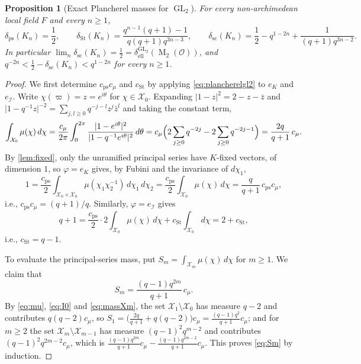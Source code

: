 \documentclass[11pt,reqno]{amsart}
\numberwithin{equation}{section}
\theoremstyle{plain}
\newtheorem{proposition}[theorem]{Proposition}
\theoremstyle{definition}
\theoremstyle{remark}
\theoremstyle{plain}
\newcommand{\OO}{\mathcal{O}}    %
\newcommand{\scd}[1]{\delta_{\mathrm{sc}}(#1)}
\newcommand{\elld}[2][]{\delta_{\mathrm{ell}}^{#1}(#2)}  %
\newcommand{\Pps}{\delta_{\mathrm{ps}}(K_n)}       %
\newcommand{\Pst}{\delta_{\mathrm{St}}(K_n)}
\newcommand{\Cps}{c_{\mathrm{ps}}}
\newcommand{\Cst}{c_{\mathrm{St}}}
\newcommand{\Cmu}{c_\mu}
\newcommand{\Iw}{\mathcal{I}}                   %
\newcommand{\Xc}{\mathcal{X}}                   %
\newcommand{\abs}[1]{\lvert#1\rvert}
\DeclareMathOperator{\GL}{GL}
\DeclareMathOperator{\Mat}{M}
\begin{document}
\begin{proposition}[Exact Plancherel masses for $\GL_2$]\label{prop:gl2exact}
For every non-archimedean local field $F$ and every $n\ge1$,
\[
\Pps=\frac12,\qquad
\Pst=\frac{q^{n-1}(q+1)-1}{q(q+1)q^{3n-3}},\qquad
\scd{K_n}=\frac12-q^{1-2n}+\frac1{(q+1)q^{3n-2}}.
\]
In particular $\lim_n\scd{K_n}=\frac12=\elld[\GL_2]{\Mat_2(\OO)}$, and
$q^{-2n}<\frac12-\scd{K_n}<q^{1-2n}$ for every $n\ge1$.
\end{proposition}

\begin{proof}
We first determine $\Cps\Cmu$ and $\Cst$ by applying
\eqref{eq:plancherelgl2} to $e_K$ and $e_{\Iw}$.
Write $\chi(\varpi)=z=e^{i\theta}$
for $\chi\in\Xc_0$. Expanding $\abs{1-z}^2=2-z-\bar z$ and
$\abs{1-q^{-1}z}^{-2}=\sum_{j,l\ge0}q^{-j-l}z^j\bar z^l$ and taking
the constant term,
\begin{equation}\label{eq:I0}
\int_{\Xc_0}\mu(\chi)\,d\chi
=\frac{\Cmu}{2\pi}\int_0^{2\pi}\frac{\abs{1-e^{i\theta}}^2}{\abs{1-q^{-1}e^{i\theta}}^2}\,d\theta
=\Cmu\Bigl(2\sum_{j\ge0}q^{-2j}-2\sum_{j\ge0}q^{-2j-1}\Bigr)
=\frac{2q}{q+1}\,\Cmu.
\end{equation}
By \cref{lem:fixed}, only the unramified principal series have $K$-fixed
vectors, of dimension $1$, so $\varphi=e_K$ gives, by Fubini and the
invariance of $d\chi_1$,
\[
1=\frac{\Cps}{2}\int_{\Xc_0\times\Xc_0}\mu(\chi_1\chi_2^{-1})\,d\chi_1\,d\chi_2
=\frac{\Cps}{2}\int_{\Xc_0}\mu(\chi)\,d\chi=\frac{q}{q+1}\,\Cps\Cmu,
\]
i.e., $\Cps\Cmu=(q+1)/q$. Similarly, $\varphi=e_{\Iw}$ gives
\[
q+1=\frac{\Cps}{2}\cdot2\int_{\Xc_0}\mu(\chi)\,d\chi+\Cst\int_{\Xc_0}d\chi
=2+\Cst,
\]
i.e., $\Cst=q-1$.

To evaluate the principal-series mass, put
$S_m=\int_{\Xc_m}\mu(\chi)\,d\chi$ for $m\ge1$. We claim that
\begin{equation}\label{eq:Sm}
S_m=\frac{(q-1)q^{2m}}{q+1}\,\Cmu.
\end{equation}
By \eqref{eq:mu}, \eqref{eq:I0} and \eqref{eq:massXm}, the set
$\Xc_1\setminus\Xc_0$ has measure $q-2$ and contributes $q(q-2)\Cmu$, so
$S_1=\bigl(\frac{2q}{q+1}+q(q-2)\bigr)\Cmu=\frac{(q-1)q^2}{q+1}\Cmu$; and
for $m\ge2$ the set $\Xc_m\setminus\Xc_{m-1}$ has measure
$(q-1)^2q^{m-2}$ and contributes $(q-1)^2q^{2m-2}\Cmu$, which is
$\frac{(q-1)q^{2m}}{q+1}\Cmu-\frac{(q-1)q^{2m-2}}{q+1}\Cmu$. This proves
\eqref{eq:Sm} by induction.


\end{proof}
\end{document}
